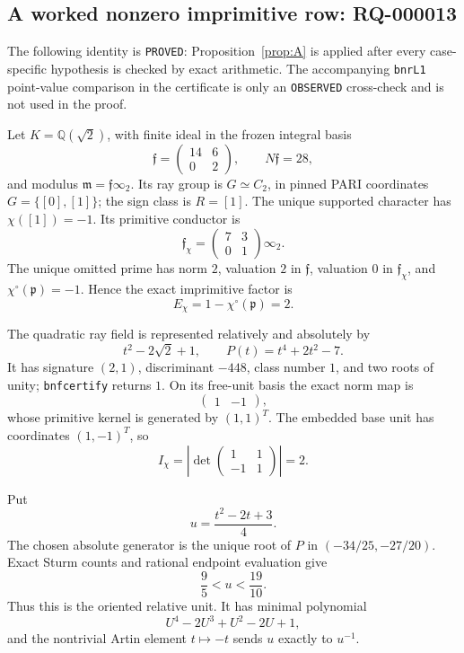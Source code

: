 \documentclass[11pt]{article}
\newcommand{\Q}{\mathbb Q}
\begin{document}
\subsection{A worked nonzero imprimitive row: RQ-000013}
\label{sec:rq000013}

The following identity is \texttt{PROVED}: Proposition~\ref{prop:A}
is applied after every case-specific hypothesis is checked by exact
arithmetic.  The accompanying \texttt{bnrL1} point-value comparison
in the certificate is only an \texttt{OBSERVED} cross-check and is
not used in the proof.

Let \(K=\Q(\sqrt2)\), with finite ideal in the frozen integral basis
\[
 \mathfrak f=\begin{pmatrix}14&6\\0&2\end{pmatrix},
 \qquad N\mathfrak f=28,
\]
and modulus \(\mathfrak m=\mathfrak f\infty_2\).  Its ray group is
\(G\simeq C_2\), in pinned PARI coordinates \(G=\{[0],[1]\}\);
the sign class is \(R=[1]\).  The unique supported character has
\(\chi([1])=-1\).  Its primitive conductor is
\[
 \mathfrak f_\chi=\begin{pmatrix}7&3\\0&1\end{pmatrix}\infty_2.
\]
The unique omitted prime has norm \(2\), valuation \(2\) in
\(\mathfrak f\), valuation \(0\) in \(\mathfrak f_\chi\), and
\(\chi^\circ(\mathfrak p)=-1\).  Hence the exact imprimitive factor is
\[
 E_\chi=1-\chi^\circ(\mathfrak p)=2.
\]

The quadratic ray field is represented relatively and absolutely by
\[
 t^2-2\sqrt2+1,\qquad P(t)=t^4+2t^2-7.
\]
It has signature \((2,1)\), discriminant \(-448\), class number \(1\),
and two roots of unity; \texttt{bnfcertify} returns \(1\).
On its free-unit basis the exact norm map is
\[
 \begin{pmatrix}1&-1\end{pmatrix},
\]
whose primitive kernel is generated by \((1,1)^T\).  The embedded base
unit has coordinates \((1,-1)^T\), so
\[
 I_\chi=\left|\det
 \begin{pmatrix}1&1\\-1&1\end{pmatrix}\right|=2.
\]

Put
\[
 u=\frac{t^2-2t+3}{4}.
\]
The chosen absolute generator is the unique root of \(P\) in
\((-34/25,-27/20)\).  Exact Sturm counts and rational endpoint
evaluation give
\[
 \frac95<u<\frac{19}{10}.
\]
Thus this is the oriented relative unit.  It has minimal polynomial
\[
 U^4-2U^3+U^2-2U+1,
\]
and the nontrivial Artin element \(t\mapsto-t\) sends \(u\) exactly to
\(u^{-1}\).
\end{document}
